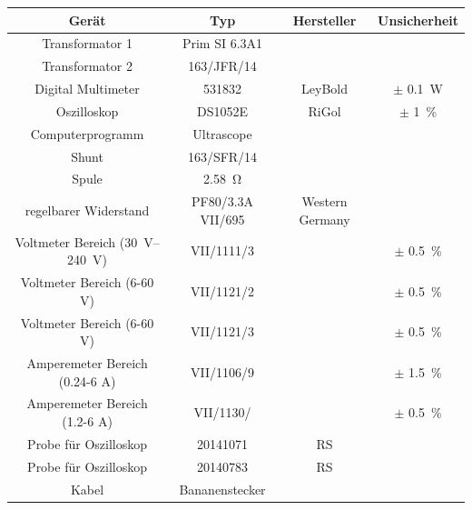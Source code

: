 \documentclass[11pt,ngerman]{scrartcl}
\begin{document}
\begin{center}
	\begin{tabular}{|c|c|c|c|} \hline
		\textbf{Gerät}                               & \textbf{Typ}       & \textbf{Hersteller} & \textbf{Unsicherheit}    \\ \hline

		Transformator 1                              & Prim SI 6.3A1      &                     &                          \\ \hline
		Transformator 2                              & 163/JFR/14         &                     &                          \\ \hline
		Digital Multimeter                           & 531832             & LeyBold             & $\pm$ \SI{0.1}{\watt}    \\ \hline
		Oszilloskop                                  & DS1052E            & RiGol               & $\pm$ \SI{1}{\percent}   \\ \hline
		Computerprogramm                             & Ultrascope         &                     &                          \\ \hline
		Shunt                                        & 163/SFR/14         &                     &                          \\ \hline
		Spule                                        & \SI{2.58}{\ohm}    &                     &                          \\ \hline
		regelbarer Widerstand                        & PF80/3.3A  VII/695 & Western Germany     &                          \\ \hline
		Voltmeter Bereich (\SIrange{30}{240}{\volt}) & VII/1111/3         &                     & $\pm$ \SI{0.5}{\percent} \\ \hline
		Voltmeter Bereich (6-60 V)                   & VII/1121/2         &                     & $\pm$ \SI{0.5}{\percent} \\ \hline
		Voltmeter Bereich (6-60 V)                   & VII/1121/3         &                     & $\pm$ \SI{0.5}{\percent} \\ \hline
		Amperemeter Bereich (0.24-6 A)               & VII/1106/9         &                     & $\pm$ \SI{1.5}{\percent} \\ \hline
		Amperemeter Bereich (1.2-6 A)                & VII/1130/          &                     & $\pm$ \SI{0.5}{\percent} \\ \hline
		Probe für Oszilloskop                        & \num{20141071}     & RS                  &                          \\ \hline
		Probe für Oszilloskop                        & 20140783           & RS                  &                          \\ \hline
		Kabel                                        & Bananenstecker     &                     &                          \\ \hline
	\end{tabular}
	\label{tab:material}
\end{center}
\end{document}

